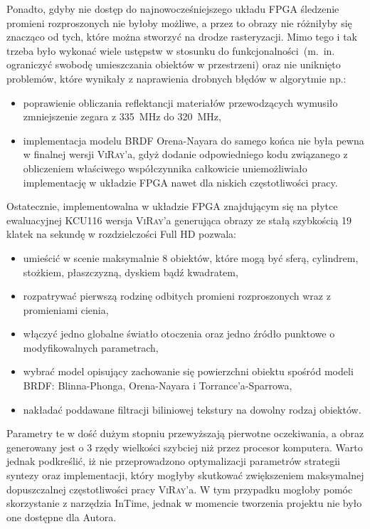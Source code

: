 Ponadto, gdyby nie dostęp do najnowocześniejszego układu FPGA śledzenie promieni rozproszonych nie byłoby możliwe, a przez to obrazy nie różniłyby się znacząco od tych, które można stworzyć na drodze rasteryzacji. Mimo tego i tak trzeba było wykonać wiele ustępstw w stosunku do funkcjonalności~(m.~in. ograniczyć swobodę umieszczania obiektów w przestrzeni) oraz nie uniknięto problemów, które wynikały z naprawienia drobnych błędów w algorytmie np.:
\begin{itemize}
\item poprawienie obliczania reflektancji materiałów przewodzących wymusiło zmniejszenie zegara z 335~MHz do 320~MHz,
\item implementacja modelu BRDF Orena-Nayara do samego końca nie była pewna w finalnej wersji \textsc{ViRay}'a, gdyż dodanie odpowiedniego kodu związanego z obliczeniem właściwego współczynnika całkowicie uniemożliwiało implementację w układzie FPGA nawet dla niskich częstotliwości pracy.
\end{itemize}

Ostatecznie, implementowalna w układzie FPGA znajdującym się na płytce ewaluacyjnej KCU116 wersja \textsc{ViRay}'a generująca obrazy ze stałą szybkością 19 klatek na sekundę w rozdzielczości Full HD pozwala:
\begin{itemize}
\item umieścić w scenie maksymalnie 8 obiektów, które mogą być sferą, cylindrem, stożkiem, płaszczyzną, dyskiem bądź kwadratem,
\item rozpatrywać pierwszą rodzinę odbitych promieni rozproszonych wraz z promieniami cienia,
\item włączyć jedno globalne światło otoczenia oraz jedno źródło punktowe o modyfikowalnych parametrach,
\item wybrać model opisujący zachowanie się powierzchni obiektu spośród modeli BRDF: Blinna-Phonga, Orena-Nayara i Torrance'a-Sparrowa,
\item nakładać poddawane filtracji biliniowej tekstury na dowolny rodzaj obiektów.
\end{itemize}
Parametry te w dość dużym stopniu przewyższają pierwotne oczekiwania, a obraz generowany jest o 3 rzędy wielkości szybciej niż przez procesor komputera. Warto jednak podkreślić, iż nie przeprowadzono optymalizacji parametrów strategii syntezy oraz implementacji, który mogłyby skutkować zwiększeniem maksymalnej dopuszczalnej częstotliwości pracy \textsc{ViRay}'a. W tym przypadku mogłoby pomóc skorzystanie z narzędzia InTime, jednak w momencie tworzenia projektu nie było one dostępne dla Autora.

